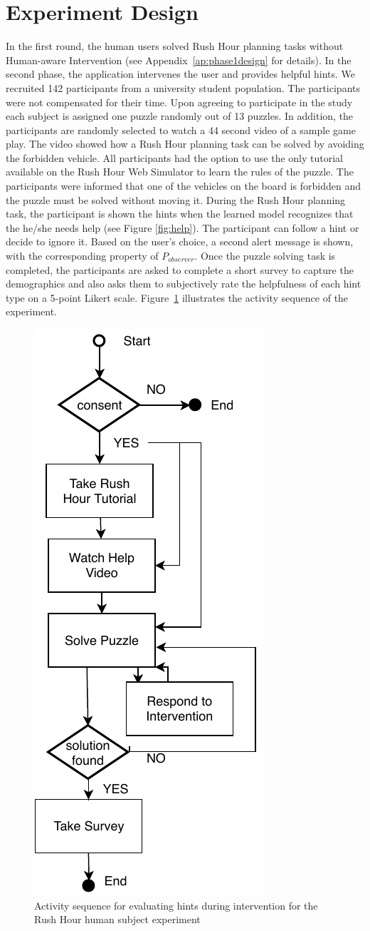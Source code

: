 \section{Experiment Design}
In the first round, the human users solved Rush Hour planning tasks without Human-aware Intervention (see Appendix~\ref{ap:phase1design} for details).
In the second phase, the application intervenes the user and provides helpful hints.
We recruited 142 participants from a university student population.
The participants were not compensated for their time.
Upon agreeing to participate in the study each subject is assigned one puzzle randomly out of 13 puzzles. 
In addition, the participants are randomly selected to watch a 44 second video of a sample game play.
The video showed how a Rush Hour planning task can be solved by avoiding the forbidden vehicle.
All participants had the option to use the only tutorial available on the Rush Hour Web Simulator to learn the rules of the puzzle.
The participants were informed that one of the vehicles on the board is forbidden and the puzzle must be solved without moving it.
During the Rush Hour planning task, the participant is shown the hints when the learned model recognizes that the he/she needs help (see Figure \ref{fig:help}). 
The participant can follow a hint or decide to ignore it.
Based on the user's choice, a second alert message is shown, with the corresponding property of $P_{observer}$. 
Once the puzzle solving task is completed, the participants are asked to complete a short survey to capture the demographics and also asks them to subjectively rate the helpfulness of each hint type on a 5-point Likert scale. 
Figure~\ref{fig:phase2} illustrates the activity sequence of the experiment.
\begin{figure}[tpb]
  \centering
  \includegraphics[height=0.6\columnwidth]{img/phase2.pdf}
  \caption{Activity sequence for evaluating hints during intervention for the Rush Hour human subject experiment}
  \label{fig:phase2}
\end{figure}

